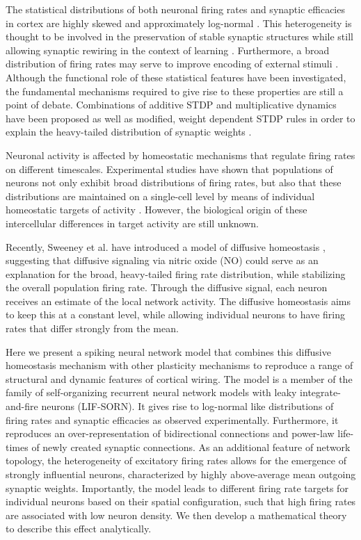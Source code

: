 \documentclass[10pt,letterpaper]{article}
\begin{document}
The statistical distributions of both neuronal firing rates and synaptic efficacies in cortex are highly skewed and approximately log-normal \cite{Song_Connectivity_2005, Lefort_2009}. This heterogeneity is thought to be involved in the preservation of stable synaptic structures while still allowing synaptic rewiring in the context of learning \cite{Buzsaki_2004, Buzsaki_Fir_Rates_2014}. Furthermore, a broad distribution of firing rates may serve to improve encoding of external stimuli \cite{Marsat_2010}. Although the functional role of these statistical features have been investigated, the fundamental mechanisms required to give rise to these properties are still a point of debate. Combinations of additive STDP and multiplicative dynamics have been proposed as well as modified, weight dependent STDP rules in order to explain the heavy-tailed distribution of synaptic weights \cite{Statman_Synapses_2014,Gilson_2011}.

Neuronal activity is affected by homeostatic mechanisms that regulate firing rates on different timescales. Experimental studies have shown that populations of neurons not only exhibit broad distributions of firing rates, but also that these distributions are maintained on a single-cell level by means of individual homeostatic targets of activity \cite{Mizuseki_2013,Hengen_2016}. However, the biological origin of these intercellular differences in target activity are still unknown.

Recently, Sweeney et al. have introduced a model of diffusive homeostasis \cite{Sweeney_Paper}, suggesting that diffusive signaling via nitric oxide (NO) could serve as an explanation for the broad, heavy-tailed firing rate distribution, while stabilizing the overall population firing rate. Through the diffusive signal, each neuron receives an estimate of the local network activity. The diffusive homeostasis aims to keep this at a constant level, while allowing individual neurons to have firing rates that differ strongly from the mean.

Here we present a spiking neural network model that combines this diffusive homeostasis mechanism with other plasticity mechanisms to reproduce a range of structural and dynamic features of cortical wiring. The model is a member of the family of self-organizing recurrent neural network models with leaky integrate-and-fire neurons (LIF-SORN). It gives rise to log-normal like distributions of firing rates and synaptic efficacies as observed experimentally. Furthermore, it reproduces an over-representation of bidirectional connections and power-law life-times of newly created synaptic connections. As an additional feature of network topology, the heterogeneity of excitatory firing rates allows for the emergence of strongly influential neurons, characterized by highly above-average mean outgoing synaptic weights. Importantly, the model leads to different firing rate targets for individual neurons based on their spatial configuration, such that high firing rates are associated with low neuron density. We then develop a mathematical theory to describe this effect analytically.
\end{document}
